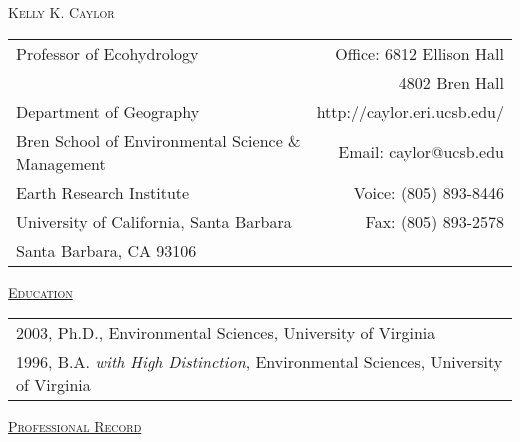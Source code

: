 \documentclass[10pt]{report}
\begin{document}
\begin{center}

\textsc{\large{Kelly K. Caylor}}

\vspace*{.1in}

\begin{tabular*}{.9 \textwidth}{ @{\extracolsep{\fill}} lr}
	Professor of Ecohydrology & Office: 6812 Ellison Hall \\
	& 4802 Bren Hall \\
	Department of Geography & http://caylor.eri.ucsb.edu/ \\
	Bren School of Environmental Science \& Management & Email: caylor@ucsb.edu \\
	Earth Research Institute &  Voice:  (805) 893-8446 \\
	University of California, Santa Barbara  & Fax: (805) 893-2578 \\
	Santa Barbara, CA 93106 & \\
\end{tabular*}

\end{center}


\vspace*{.1in}
\textsc{\underline{Education}}
\vspace*{.1in}

\begin{tabular}{l}
2003, Ph.D., Environmental Sciences, University of Virginia \\
1996, B.A. \emph{with High Distinction}, Environmental Sciences, University of Virginia \\
\end{tabular}

\vspace*{.1in}
\textsc{\underline{Professional Record}}
\vspace*{.1in}
 
\end{document}
